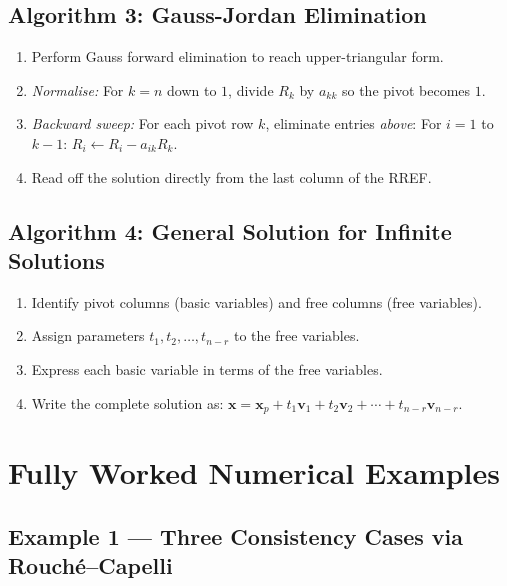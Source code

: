 \documentclass[12pt,a4paper]{article}
\begin{document}
\subsection*{Algorithm 3: Gauss-Jordan Elimination}

\begin{enumerate}[leftmargin=2em,label=\textbf{Step \arabic*.}]
  \item Perform Gauss forward elimination to reach upper-triangular form.
  \item \textit{Normalise:} For $k = n$ down to $1$, divide $R_k$ by $a_{kk}$ so the pivot becomes $1$.
  \item \textit{Backward sweep:} For each pivot row $k$, eliminate entries \textit{above}:
        For $i = 1$ to $k-1$: $R_i \leftarrow R_i - a_{ik} R_k$.
  \item Read off the solution directly from the last column of the RREF.
\end{enumerate}

\subsection*{Algorithm 4: General Solution for Infinite Solutions}

\begin{enumerate}[leftmargin=2em,label=\textbf{Step \arabic*.}]
  \item Identify pivot columns (basic variables) and free columns (free variables).
  \item Assign parameters $t_1, t_2, \ldots, t_{n-r}$ to the free variables.
  \item Express each basic variable in terms of the free variables.
  \item Write the complete solution as:
        $\mathbf{x} = \mathbf{x}_p + t_1 \mathbf{v}_1 + t_2 \mathbf{v}_2 + \cdots + t_{n-r} \mathbf{v}_{n-r}$.
\end{enumerate}

\section{Fully Worked Numerical Examples}

\subsection*{Example 1 --- Three Consistency Cases via Rouch\'{e}--Capelli}
\end{document}
